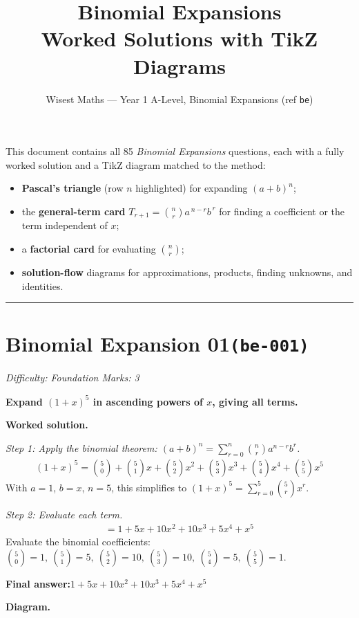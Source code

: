 \documentclass[11pt]{article}
\title{\textbf{Binomial Expansions}\\[0.3em]\large Worked Solutions with TikZ Diagrams}
\author{Wisest Maths --- Year 1 A-Level, Binomial Expansions (ref \texttt{be})}
\date{}
\newcommand{\question}[1]{\par\medskip\noindent\textbf{#1}\par}
\begin{document}
\maketitle
\noindent This document contains all 85 \emph{Binomial Expansions} questions, each with a fully
worked solution and a TikZ diagram matched to the method:
\begin{itemize}\setlength{\itemsep}{1pt}
  \item \textbf{Pascal's triangle} (row $n$ highlighted) for expanding $(a+b)^{n}$;
  \item the \textbf{general-term card} $T_{r+1}=\binom{n}{r}a^{\,n-r}b^{\,r}$ for finding a coefficient or the term independent of $x$;
  \item a \textbf{factorial card} for evaluating $\binom{n}{r}$;
  \item \textbf{solution-flow} diagrams for approximations, products, finding unknowns, and identities.
\end{itemize}
\tableofcontents
\bigskip
\hrule

\section*{Binomial Expansion 01\quad\small\texttt{(be-001)}}
\textit{Difficulty: Foundation \quad\textbar\quad Marks: 3}

\question{Expand \( (1 + x)^5 \) in ascending powers of \( x \), giving all terms.}

\textbf{Worked solution.}

\textit{Step 1: Apply the binomial theorem: \((a+b)^n = \sum_{r=0}^{n} \binom{n}{r} a^{n-r} b^r\).}
\[\begin{gathered}
(1+x)^5 = \binom{5}{0} + \binom{5}{1}x + \binom{5}{2}x^2 + \binom{5}{3}x^3 + \binom{5}{4}x^4 + \binom{5}{5}x^5
\end{gathered}\]
With \(a = 1\), \(b = x\), \(n = 5\), this simplifies to \((1+x)^5 = \sum_{r=0}^{5} \binom{5}{r} x^r\).

\textit{Step 2: Evaluate each term.}
\[\begin{gathered}
= 1 + 5x + 10x^2 + 10x^3 + 5x^4 + x^5
\end{gathered}\]
Evaluate the binomial coefficients: \(\binom{5}{0}=1,\ \binom{5}{1}=5,\ \binom{5}{2}=10,\ \binom{5}{3}=10,\ \binom{5}{4}=5,\ \binom{5}{5}=1\).

\begin{answerbox}
\textbf{Final answer:}\quad \(\displaystyle 1 + 5x + 10x^2 + 10x^3 + 5x^4 + x^5\)
\end{answerbox}
\textbf{Diagram.}
\end{document}
